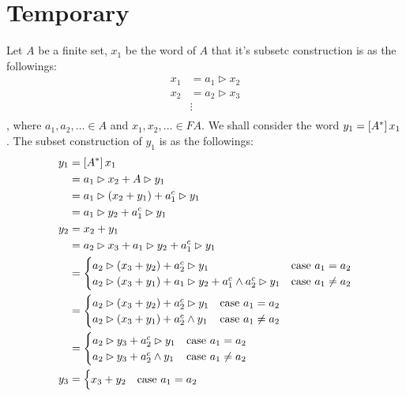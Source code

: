 \section{Temporary}
Let $A$ be a finite set, $x_1$ be the word of $A$ 
that it's subsetc construction is as the followings:
\begin{equation}\begin{split}
	x_1 &= a_1\rhd x_2 \\
	x_2 &= a_2\rhd x_3 \\
	&\vdots \\
\end{split}\end{equation}
, where $a_1,a_2,\dots\in A$  and $x_1,x_2,\dots\in FA$.
We shall consider the word $y_1=\left[{A^*}\right]x_1$.
The subset construction of $y_1$ is as the followings:
\begin{equation}\begin{split}
	y_1 &= \left[{A^*}\right]x_1 \\
		&= a_1\rhd x_2 + A\rhd y_1 \\
		&= a_1\rhd (x_2+y_1) + a_1^c\rhd y_1 \\
		&= a_1\rhd y_2 + a_1^c\rhd y_1 \\
	y_2 &= x_2 + y_1 \\
		&= a_2\rhd x_3 + a_1\rhd y_2 + a_1^c\rhd y_1 \\
		&= \begin{cases}
			a_2\rhd (x_3+y_2) + a_2^c\rhd y_1 & \text{case } a_1=a_2 \\
			a_2\rhd (x_3+y_1) + a_1\rhd y_2 + a_1^c\wedge a_2^c\rhd y_1 & \text{case }a_1\not=a_2 \\
			\end{cases} \\
		&= \begin{cases}
			a_2\rhd (x_3+y_2) + a_2^c\rhd y_1 & \text{case } a_1=a_2 \\
			a_2\rhd (x_3+y_1) + a_2^c\wedge y_1 & \text{case } a_1\not=a_2 \\
			\end{cases} \\
		&= \begin{cases}
			a_2\rhd y_3 + a_2^c\rhd y_1 & \text{case } a_1=a_2 \\
			a_2\rhd y_3 + a_2^c\wedge y_1 & \text{case } a_1\not=a_2 \\
			\end{cases} \\
		y_3 &= \begin{cases}
			x_3+y_2 & \text{case } a_1=a_2 \\

\end{cases}
\end{split}
\end{equation}
